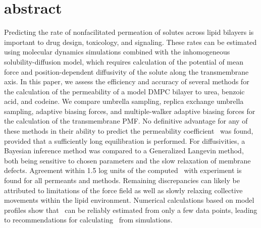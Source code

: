 \section{abstract}
Predicting the rate of nonfacilitated permeation of solutes across lipid bilayers is important to drug design, toxicology, and signaling. These rates can be estimated using molecular dynamics simulations combined with the inhomogeneous solubility-diffusion model, which requires calculation of the potential of mean force and position-dependent diffusivity of the solute along the transmembrane axis. In this paper, we assess the efficiency and accuracy of several methods for the calculation of the permeability of a model DMPC bilayer to urea, benzoic acid, and codeine. We compare umbrella sampling, replica exchange umbrella sampling, adaptive biasing forces, and multiple-walker adaptive biasing forces for the calculation of the transmembrane PMF. No definitive advantage for any of these methods in their ability to predict the permeability coefficient \perm~was found, provided that a sufficiently long equilibration is performed. For diffusivities, a Bayesian inference method was compared to a Generalized Langevin method, both being sensitive to chosen parameters and the slow relaxation of membrane defects.
Agreement within 1.5 log units of the computed \perm~with experiment is found for all permeants and methods.  Remaining discrepancies can likely be attributed to limitations of the force field as well as slowly relaxing collective movements within the lipid environment.  Numerical calculations based on model profiles show that \perm~can be reliably estimated from only a few data points, leading to recommendations for calculating \perm~from simulations.


